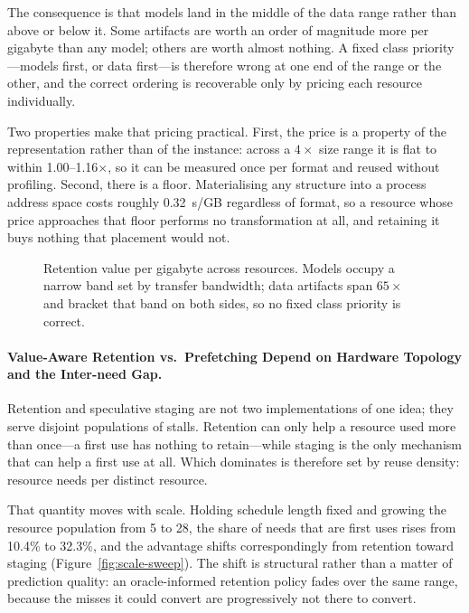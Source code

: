 The consequence is that models land in the middle of the data range rather
than above or below it. Some artifacts are worth an order of magnitude more
per gigabyte than any model; others are worth almost nothing. A fixed class
priority---models first, or data first---is therefore wrong at one end of the
range or the other, and the correct ordering is recoverable only by pricing
each resource individually.

Two properties make that pricing practical. First, the price is a property of
the representation rather than of the instance: across a $4\times$ size range
it is flat to within 1.00--1.16$\times$, so it can be measured once per format
and reused without profiling. Second, there is a floor. Materialising any
structure into a process address space costs roughly 0.32~s/GB regardless of
format, so a resource whose price approaches that floor performs no
transformation at all, and retaining it buys nothing that placement would not.

\begin{figure}[t]
\centering
{}
\caption{Retention value per gigabyte across resources. Models occupy a narrow
band set by transfer bandwidth; data artifacts span $65\times$ and bracket
that band on both sides, so no fixed class priority is correct.}
\label{fig:sgb-spread}
\end{figure}

\paragraph{Value-Aware Retention vs.\ Prefetching Depend on Hardware Topology
and the Inter-need Gap.}
Retention and speculative staging are not two implementations of one idea;
they serve disjoint populations of stalls. Retention can only help a resource
used more than once---a first use has nothing to retain---while staging is the
only mechanism that can help a first use at all. Which dominates is therefore
set by reuse density: resource needs per distinct resource.

That quantity moves with scale. Holding schedule length fixed and growing the
resource population from 5 to 28, the share of needs that are first uses rises
from 10.4\% to 32.3\%, and the advantage shifts correspondingly from retention
toward staging (Figure~\ref{fig:scale-sweep}). The shift is structural rather
than a matter of prediction quality: an oracle-informed retention policy fades
over the same range, because the misses it could convert are progressively not
there to convert.  %

